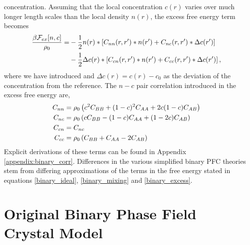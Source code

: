 concentration. Assuming that the local concentration $c(r)$ varies over much
longer length scales than the local density $n(r)$, the excess free energy term
becomes  
%
\begin{align}
    \label{binary_excess}
    \frac{\beta\mathcal{F}_{ex}[n, c]}{\rho_0}
        = &-\frac{1}{2} n(r) \ast \left[ 
            C_{nn}(r, r^\prime) \ast n(r^\prime) 
          + C_{nc}(r, r^\prime) \ast \Delta c(r^\prime)\right] \\
        &-\frac{1}{2} \Delta c(r) \ast \left[
            C_{cn}(r, r^\prime) \ast n(r^\prime) 
          + C_{cc}(r, r^\prime) \ast \Delta c(r^\prime)\right], \nonumber
\end{align}
%
where we have introduced  and $\Delta c(r) = c(r) - c_0$ as the deviation of the 
concentration from the reference.  The $n-c$ pair correlation introduced in the 
excess free energy are,
%
\begin{align}
    C_{nn} &= \rho_0\left(c^2 C_{BB} + (1 - c)^2C_{AA} + 2c(1-c)C_{AB}\right) \label{orig_nnC}\\
    C_{nc} &= \rho_0\left(c C_{BB} - (1 - c) C_{AA} + (1 - 2c)C_{AB}\right) \\
    C_{cn} &= C_{nc} \\
    C_{cc} &= \rho_0\left(C_{BB} + C_{AA} - 2 C_{AB}\right)
\end{align}
%
Explicit derivations of these terms can be found in Appendix \ref{appendix:binary_corr}.
Differences in the various simplified binary PFC theories stem from differing
approximations of the terms in the free energy stated in equations 
\ref{binary_ideal}, \ref{binary_mixing} and \ref{binary_excess}.

\section{Original Binary Phase Field Crystal Model} %

